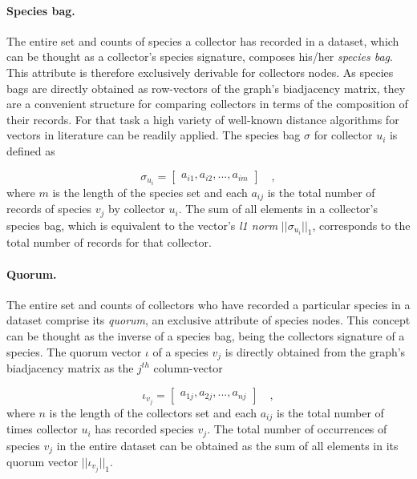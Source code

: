 {\paragraph{Species bag.} 
The entire set and counts of species a collector has recorded in a dataset, which can be thought as a collector's species signature, composes his/her \textit{species bag}. This attribute is therefore exclusively derivable for collectors nodes.
As species bags are directly obtained as row-vectors of the graph's biadjacency matrix, they are a convenient structure for comparing collectors in terms of the composition of their records.
For that task a high variety of well-known distance algorithms for vectors in literature can be readily applied.
The species bag $\sigma$ for collector $u_i$ is defined as

$$
\sigma_{u_i} =  \begin{bmatrix}
a_{i 1}, a_{i 2}, ..., a_{i m}
\end{bmatrix}  \quad ,
$$
where $m$ is the length of the species set and each $a_{i j}$ is the total number of records of species $v_j$ by collector $u_i$. The sum of all elements in a collector's species bag, which is equivalent to the vector's \textit{l1 norm} $||\sigma_{u_i}||_1$, corresponds to the total number of records for that collector.

 
\paragraph{Quorum.} 
The entire set and counts of collectors who have recorded a particular species in a dataset comprise its \textit{quorum}, an exclusive attribute of species nodes. 
This concept can be thought as the inverse of a species bag, being the collectors signature of a species. 
The quorum vector $\iota$ of a species $v_j$ is directly obtained from the graph's biadjacency matrix as the $j^{th}$ column-vector 

$$
\iota_{v_j} = \begin{bmatrix}
a_{1 j}, a_{2 j}, ..., a_{n j}
\end{bmatrix} \quad ,
$$
where $n$ is the length of the collectors set and each $a_{i j}$ is the total number of times collector $u_i$ has recorded species $v_j$. 
The total number of occurrences of species $v_j$ in the entire dataset can be obtained as the sum of all elements in its quorum vector $ || \iota_{v_j} ||_1$.


}
